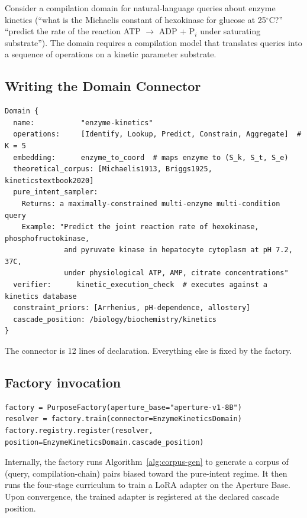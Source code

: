 \documentclass[twocolumn,11pt,a4paper]{article}
\begin{document}
Consider a compilation domain for natural-language queries about enzyme kinetics (``what is the Michaelis constant of hexokinase for glucose at 25$^\circ$C?'' ``predict the rate of the reaction ATP $\to$ ADP + P$_i$ under saturating substrate''). The domain requires a compilation model that translates queries into a sequence of operations on a kinetic parameter substrate.

\subsection{Writing the Domain Connector}

\begin{verbatim}
Domain {
  name:           "enzyme-kinetics"
  operations:     [Identify, Lookup, Predict, Constrain, Aggregate]  # K = 5
  embedding:      enzyme_to_coord  # maps enzyme to (S_k, S_t, S_e)
  theoretical_corpus: [Michaelis1913, Briggs1925, kineticstextbook2020]
  pure_intent_sampler:
    Returns: a maximally-constrained multi-enzyme multi-condition query
    Example: "Predict the joint reaction rate of hexokinase, phosphofructokinase,
              and pyruvate kinase in hepatocyte cytoplasm at pH 7.2, 37C,
              under physiological ATP, AMP, citrate concentrations"
  verifier:      kinetic_execution_check  # executes against a kinetics database
  constraint_priors: [Arrhenius, pH-dependence, allostery]
  cascade_position: /biology/biochemistry/kinetics
}
\end{verbatim}

The connector is 12 lines of declaration. Everything else is fixed by the factory.

\subsection{Factory invocation}

\begin{verbatim}
factory = PurposeFactory(aperture_base="aperture-v1-8B")
resolver = factory.train(connector=EnzymeKineticsDomain)
factory.registry.register(resolver, position=EnzymeKineticsDomain.cascade_position)
\end{verbatim}

Internally, the factory runs Algorithm~\ref{alg:corpus-gen} to generate a corpus of (query, compilation-chain) pairs biased toward the pure-intent regime. It then runs the four-stage curriculum to train a LoRA adapter on the Aperture Base. Upon convergence, the trained adapter is registered at the declared cascade position.
\end{document}
